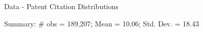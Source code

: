 \documentclass[11pt]{beamer}
\begin{document}
\begin{frame}{Data - Patent Citation Distributions}
	\begin{center}
	\begin{figure}\centering\label{Innov7}
	\begin{minipage}[b]{0.45\linewidth}
	\end{minipage}
	\begin{minipage}[b]{0.45\linewidth}
	\end{minipage}
	\end{figure}
	\end{center}
	Summary: \# obs = 189,207; Mean = 10.06; Std. Dev. = 18.43
\end{frame}
\end{document}
